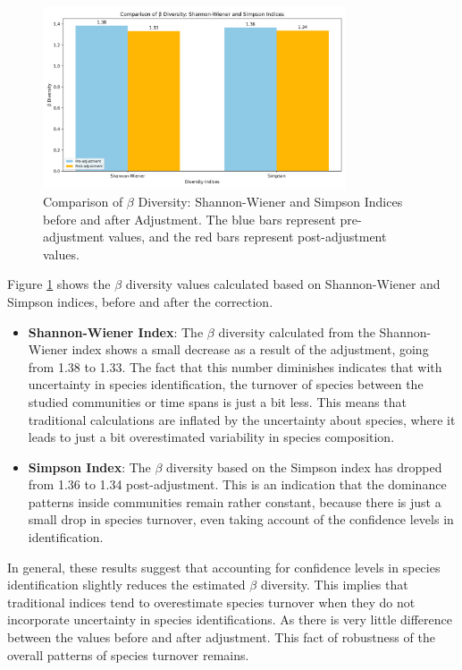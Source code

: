 \documentclass[a4paper,12pt]{article}
\begin{document}
\begin{figure}[H]
\centering
\includegraphics[width=0.8\textwidth]{Figures/beta_diversity.png}
\caption{Comparison of $\beta$ Diversity: Shannon-Wiener and Simpson Indices before and after Adjustment. The blue bars represent pre-adjustment values, and the red bars represent post-adjustment values.}
\label{fig:beta_diversity}
\end{figure}

Figure \ref{fig:beta_diversity} shows the $\beta$ diversity values calculated based on Shannon-Wiener and Simpson indices, before and after the correction.

\begin{itemize}
\item \textbf{Shannon-Wiener Index}: The $\beta$ diversity calculated from the Shannon-Wiener index shows a small decrease as a result of the adjustment, going from 1.38 to 1.33. The fact that this number diminishes indicates that with uncertainty in species identification, the turnover of species between the studied communities or time spans is just a bit less. This means that traditional calculations are inflated by the uncertainty about species, where it leads to just a bit overestimated variability in species composition.
\item \textbf{Simpson Index}: The $\beta$ diversity based on the Simpson index has dropped from 1.36 to 1.34 post-adjustment. This is an indication that the dominance patterns inside communities remain rather constant, because there is just a small drop in species turnover, even taking account of the confidence levels in identification. 
\end{itemize}

In general, these results suggest that accounting for confidence levels in species identification slightly reduces the estimated $\beta$ diversity. This implies that traditional indices tend to overestimate species turnover when they do not incorporate uncertainty in species identifications. As there is very little difference between the values before and after adjustment. This fact of robustness of the overall patterns of species turnover remains.
\end{document}
